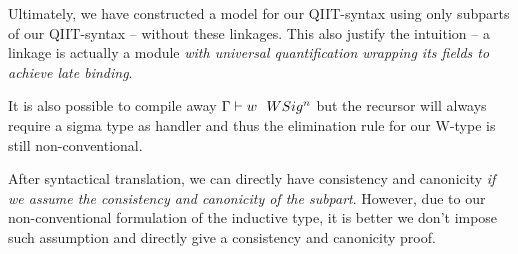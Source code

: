 Ultimately, we have constructed a model for our QIIT-syntax using only subparts of our QIIT-syntax -- without these linkages. This also justify the intuition -- a linkage is actually a module \textit{with universal quantification wrapping its fields to achieve late binding}. 

It is also possible to compile away ${ {\Gamma} \vdash {w} \ \ WSig^{n} }$ but the recursor will always require a sigma type as handler and thus the elimination rule for our W-type is still non-conventional.

After syntactical translation, we can directly have consistency and canonicity \textit{if we assume the consistency and canonicity of the subpart}. However, due to our non-conventional formulation of the inductive type, it is better we don't impose such assumption and directly give a consistency and canonicity proof.
